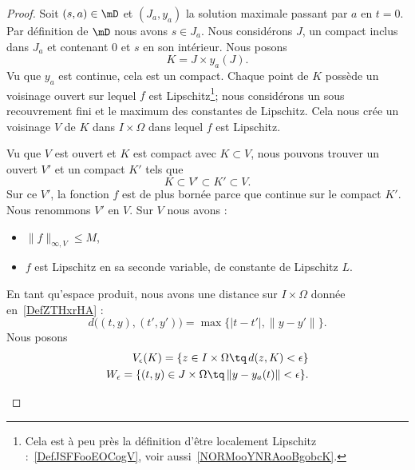 \begin{proof}
	Soit \( (s,a)\in\mD\) et \( (J_a,y_a)\) la solution maximale passant par \( a\) en \( t=0\). Par définition de \( \mD\) nous avons \( s\in J_a\). Nous considérons \( J\), un compact inclus dans \( J_a\) et contenant \( 0\) et \( s\) en son intérieur. Nous posons
	\begin{equation}
		K=J\times y_a(J).
	\end{equation}
	Vu que \( y_a\) est continue, cela est un compact. Chaque point de \( K\) possède un voisinage ouvert sur lequel \( f\) est Lipschitz\footnote{Cela est à peu près la définition d'être localement Lipschitz :~\ref{DefJSFFooEOCogV}, voir aussi~\ref{NORMooYNRAooBgobcK}.}; nous considérons un sous recouvrement fini et le maximum des constantes de Lipschitz. Cela nous crée un voisinage \( V\) de \( K\) dans \( I\times \Omega\) dans lequel \( f\) est Lipschitz.

	Vu que \( V\) est ouvert et \( K\) est compact avec \( K\subset V\), nous pouvons trouver un ouvert \( V'\) et un compact \( K'\) tels que
	\begin{equation}
		K\subset V'\subset K'\subset V.
	\end{equation}
	Sur ce \( V'\), la fonction \( f\) est de plus bornée parce que continue sur le compact \( K'\). Nous renommons \( V'\) en \( V\). Sur \( V\) nous avons :
	\begin{itemize}
		\item \( \| f \|_{\infty,V}\leq M\),
		\item \( f\) est Lipschitz en sa seconde variable, de constante de Lipschitz \( L\).
	\end{itemize}


	En tant qu'espace produit, nous avons une distance sur \( I\times \Omega\) donnée en~\ref{DefZTHxrHA} :
	\begin{equation}
		d\big( (t,y),(t',y') \big)=\max\big\{  | t-t' |,\| y-y' \|   \big\}.
	\end{equation}
	Nous posons
	\begin{subequations}
		\begin{align}
			V_{\epsilon}(K)=\{ z\in I\times \Omega \tq\,d(z,K)<\epsilon  \} \\
			W_{\epsilon}=\{ (t,y)\in J\times \Omega\tq\,\| y- y_a(t) \|<\epsilon \}.
		\end{align}
	\end{subequations}

	\begin{subproof}


\end{subproof}
\end{proof}
